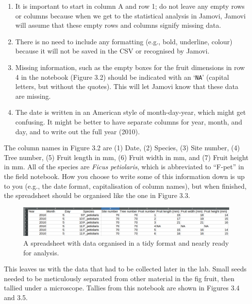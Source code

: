 \documentclass[
]{scrbook}
\providecommand{\tightlist}{%
  \setlength{\itemsep}{0pt}\setlength{\parskip}{0pt}}
\begin{document}
\begin{enumerate}
\def\labelenumi{\arabic{enumi}.}
\tightlist
\item
  It is important to start in column A and row 1; do not leave any empty rows or columns because when we get to the statistical analysis in Jamovi, Jamovi will assume that these empty rows and columns signify missing data.
\item
  There is no need to include any formatting (e.g., bold, underline, colour) because it will not be saved in the CSV or recognised by Jamovi.
\item
  Missing information, such as the empty boxes for the fruit dimensions in row 4 in the notebook (Figure 3.2) should be indicated with an `\texttt{NA}' (capital letters, but without the quotes). This will let Jamovi know that these data are missing.
\item
  The date is written in an American style of month-day-year, which might get confusing. It might be better to have separate columns for year, month, and day, and to write out the full year (2010).
\end{enumerate}

The column names in Figure 3.2 are (1) Date, (2) Species, (3) Site number, (4) Tree number, (5) Fruit length in mm, (6) Fruit width in mm, and (7) Fruit height in mm.
All of the species are \emph{Ficus petiolaris}, which is abbreviated to ``F-pet'' in the field notebook.
How you choose to write some of this information down is up to you (e.g., the date format, capitalisation of column names), but when finished, the spreadsheet should be organised like the one in Figure 3.3.

\begin{figure}
\includegraphics[width=1\linewidth]{img/Ch1_Ex1a} \caption{A spreadsheet with data organised in a tidy format and nearly ready for analysis.}\label{fig:unnamed-chunk-13}
\end{figure}

This leaves us with the data that had to be collected later in the lab.
Small seeds needed to be meticulously separated from other material in the fig fruit, then tallied under a microscope.
Tallies from this notebook are shown in Figures 3.4 and 3.5.
\end{document}
